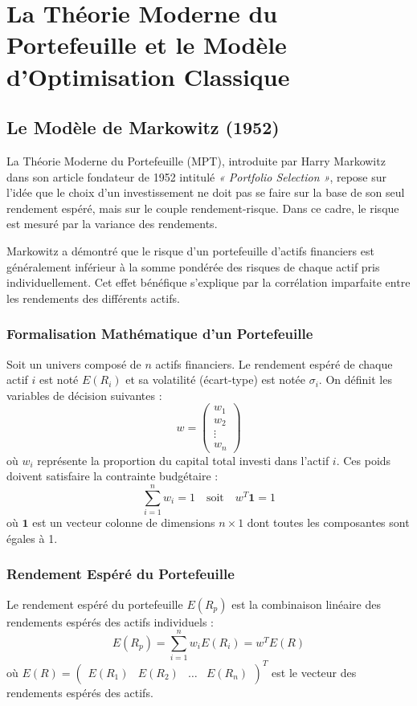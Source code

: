 \chapter{La Théorie Moderne du Portefeuille et le Modèle d'Optimisation Classique}

\section{Le Modèle de Markowitz (1952)}
La Théorie Moderne du Portefeuille (MPT), introduite par Harry Markowitz dans son article fondateur de 1952 intitulé \textit{« Portfolio Selection »}, repose sur l'idée que le choix d'un investissement ne doit pas se faire sur la base de son seul rendement espéré, mais sur le couple rendement-risque. Dans ce cadre, le risque est mesuré par la variance des rendements. 

Markowitz a démontré que le risque d'un portefeuille d'actifs financiers est généralement inférieur à la somme pondérée des risques de chaque actif pris individuellement. Cet effet bénéfique s'explique par la corrélation imparfaite entre les rendements des différents actifs.

\subsection{Formalisation Mathématique d'un Portefeuille}
Soit un univers composé de $n$ actifs financiers. Le rendement espéré de chaque actif $i$ est noté $E(R_i)$ et sa volatilité (écart-type) est notée $\sigma_i$.
On définit les variables de décision suivantes :
\begin{equation}
    w = \begin{pmatrix} w_1 \\ w_2 \\ \vdots \\ w_n \end{pmatrix}
\end{equation}
où $w_i$ représente la proportion du capital total investi dans l'actif $i$. Ces poids doivent satisfaire la contrainte budgétaire :
\begin{equation}
    \sum_{i=1}^{n} w_i = 1 \quad \text{soit} \quad w^T \mathbf{1} = 1
\end{equation}
où $\mathbf{1}$ est un vecteur colonne de dimensions $n \times 1$ dont toutes les composantes sont égales à 1.

\subsection{Rendement Espéré du Portefeuille}
Le rendement espéré du portefeuille $E(R_p)$ est la combinaison linéaire des rendements espérés des actifs individuels :
\begin{equation}
    E(R_p) = \sum_{i=1}^{n} w_i E(R_i) = w^T E(R)
\end{equation}
où $E(R) = \begin{pmatrix} E(R_1) & E(R_2) & \dots & E(R_n) \end{pmatrix}^T$ est le vecteur des rendements espérés des actifs.

